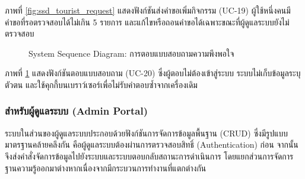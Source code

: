 ภาพที่ \ref{fig:ssd_tourist_request} แสดงฟังก์ชันส่งคำขอเพิ่มกิจกรรม (UC-19) ผู้ใช้หนึ่งคนมีคำขอที่รอตรวจสอบได้ไม่เกิน 5 รายการ และแก้ไขหรือถอนคำขอได้เฉพาะขณะที่ผู้ดูแลระบบยังไม่ตรวจสอบ

\begin{figure}[H]
\centering
{}
\caption{System Sequence Diagram: การตอบแบบสอบถามความพึงพอใจ}
\label{fig:ssd_tourist_survey}
\end{figure}

ภาพที่ \ref{fig:ssd_tourist_survey} แสดงฟังก์ชันตอบแบบสอบถาม (UC-20) ซึ่งผู้ตอบไม่ต้องเข้าสู่ระบบ ระบบไม่เก็บข้อมูลระบุตัวตน และใช้คุกกี้บนเบราว์เซอร์เพื่อไม่รับคำตอบซ้ำจากเครื่องเดิม

\subsubsection{สำหรับผู้ดูแลระบบ (Admin Portal)}

ระบบในส่วนของผู้ดูแลระบบประกอบด้วยฟังก์ชันการจัดการข้อมูลพื้นฐาน (CRUD) ซึ่งมีรูปแบบมาตรฐานคล้ายคลึงกัน คือผู้ดูแลระบบต้องผ่านการตรวจสอบสิทธิ์ (Authentication) ก่อน จากนั้นจึงส่งคำสั่งจัดการข้อมูลไปยังระบบและระบบตอบกลับสถานะการดำเนินการ โดยแยกส่วนการจัดการฐานความรู้ออกมาต่างหากเนื่องจากมีกระบวนการทำงานที่แตกต่างกัน

